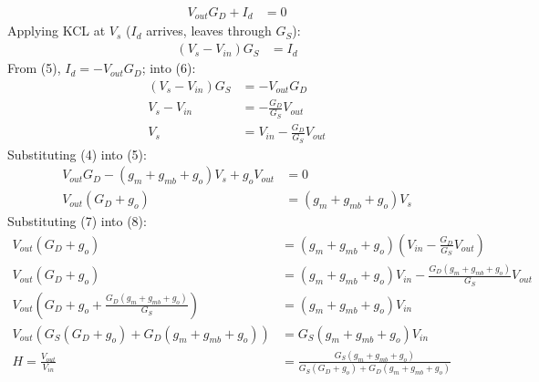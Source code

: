 \begin{enumerate}
    \begin{align*}
      V_{out} G_D + I_d &= 0 \tag{5}
    \end{align*}
    Applying KCL at \(V_s\) (\(I_d\) arrives, leaves through \(G_S\)):
    \begin{align*}
      (V_s - V_{in}) G_S &= I_d \tag{6}
    \end{align*}
    From (5), \(I_d = -V_{out} G_D\); into (6):
    \begin{align*}
      (V_s - V_{in}) G_S &= -V_{out} G_D \\
      V_s - V_{in} &= -\frac{G_D}{G_S} V_{out} \\
      V_s &= V_{in} - \frac{G_D}{G_S} V_{out} \tag{7}
    \end{align*}
    Substituting (4) into (5):
    \begin{align*}
      V_{out} G_D - (g_m + g_{mb} + g_o) V_s + g_o V_{out} &= 0 \\
      V_{out}(G_D + g_o) &= (g_m + g_{mb} + g_o) V_s \tag{8}
    \end{align*}
    Substituting (7) into (8):
    \begin{align*}
      V_{out}(G_D + g_o) &= (g_m + g_{mb} + g_o)\left(V_{in} - \frac{G_D}{G_S} V_{out}\right) \\
      V_{out}(G_D + g_o) &= (g_m + g_{mb} + g_o) V_{in} - \frac{G_D (g_m + g_{mb} + g_o)}{G_S} V_{out} \\
      V_{out}\left(G_D + g_o + \frac{G_D (g_m + g_{mb} + g_o)}{G_S}\right) &= (g_m + g_{mb} + g_o) V_{in} \\
      V_{out}\left(G_S (G_D + g_o) + G_D (g_m + g_{mb} + g_o)\right) &= G_S (g_m + g_{mb} + g_o) V_{in} \\
      H = \frac{V_{out}}{V_{in}} &= \frac{G_S (g_m + g_{mb} + g_o)}{G_S (G_D + g_o) + G_D (g_m + g_{mb} + g_o)} \tag{9}
    \end{align*}
\end{enumerate}

